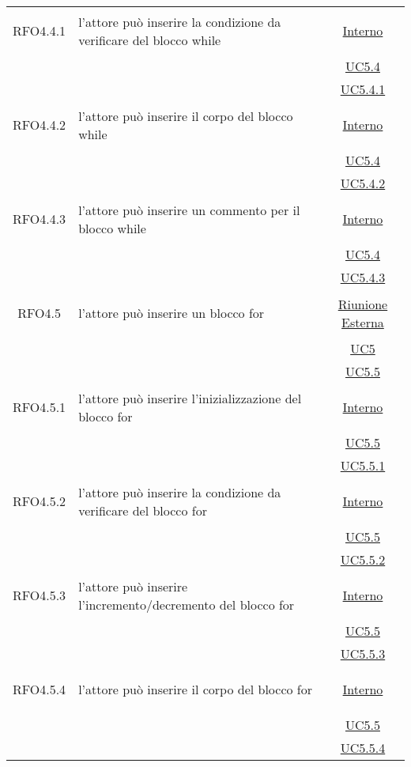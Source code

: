 \begin{longtable}{|c|>{\centering}m{7cm}|c|}
\hypertarget{RFO4.4.1}{RFO4.4.1} & l'attore può inserire la condizione da verificare del blocco while & \hyperlink{Interno}{Interno}\\
& &\hyperref[UC5.4]{UC5.4}\\
& &\hyperref[UC5.4.1]{UC5.4.1}\\ \hline

\hypertarget{RFO4.4.2}{RFO4.4.2} & l'attore può inserire il corpo del blocco while & \hyperlink{Interno}{Interno}\\
& &\hyperref[UC5.4]{UC5.4}\\
& &\hyperref[UC5.4.2]{UC5.4.2}\\ \hline

\hypertarget{RFO4.4.3}{RFO4.4.3} & l'attore può inserire un commento per il blocco while & \hyperlink{Interno}{Interno}\\
& &\hyperref[UC5.4]{UC5.4}\\
& &\hyperref[UC5.4.3]{UC5.4.3}\\ \hline

\hypertarget{RFO4.5}{RFO4.5} & l'attore può inserire un blocco for &  \hyperlink{Riunione Esterna}{Riunione Esterna}\\
& &\hyperref[UC5]{UC5}\\
& &\hyperref[UC5.5]{UC5.5}\\ \hline

\hypertarget{RFO4.5.1}{RFO4.5.1} & l'attore può inserire l'inizializzazione del blocco for & \hyperlink{Interno}{Interno}\\
& &\hyperref[UC5.5]{UC5.5}\\
& &\hyperref[UC5.5.1]{UC5.5.1}\\ \hline

\hypertarget{RFO4.5.2}{RFO4.5.2} & l'attore può inserire la condizione da verificare del blocco for & \hyperlink{Interno}{Interno}\\
& &\hyperref[UC5.5]{UC5.5}\\
& &\hyperref[UC5.5.2]{UC5.5.2}\\ \hline

\hypertarget{RFO4.5.3}{RFO4.5.3} & l'attore può inserire l'incremento/decremento del blocco for & \hyperlink{Interno}{Interno}\\
& &\hyperref[UC5.5]{UC5.5}\\
& &\hyperref[UC5.5.3]{UC5.5.3}\\ \hline

\hypertarget{RFO4.5.4}{RFO4.5.4} & l'attore può inserire il corpo del blocco for &\hyperlink{Interno}{Interno}\\
& &\hyperref[UC5.5]{UC5.5}\\
& &\hyperref[UC5.5.4]{UC5.5.4}\\ \hline


\end{longtable}
